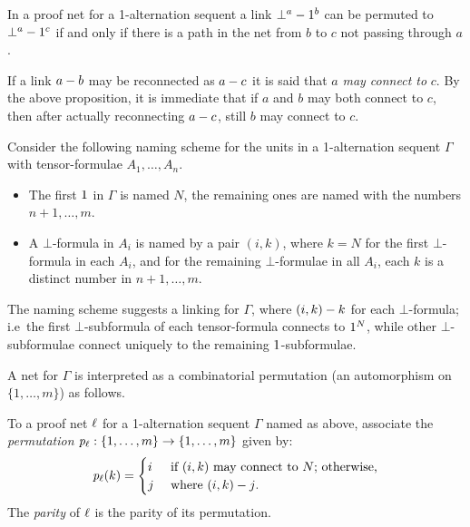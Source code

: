 \begin{proposition}
\label{prop:level0 may-connect path}
%
In a proof net for a 1-alternation sequent a link $\bot^{a}-1^{b}$ can be permuted to $\bot^{a}-1^{c}$ if and only if there is a path in the net from $b$ to $c$ not passing through $a$.
%
\end{proposition}


If a link $a-b$ may be reconnected as $a-c$ it is said that $a$ \emph{may connect to} $c$. 
%
By the above proposition, it is immediate that if $a$ and $b$ may both connect to $c$, then after actually reconnecting $a-c$, still $b$ may connect to $c$.



Consider the following naming scheme for the units in a 1-alternation sequent $\Gamma$ with tensor-formulae $A_1,\dotsc,A_n$.
%
\begin{itemize}

	\item
The first $1$ in $\Gamma$ is named $N$, the remaining ones are named with the numbers $n+1,\dotsc,m$.

	\item
A $\bot$-formula in $A_i$ is named by a pair $(i,k)$, where $k=N$ for the first $\bot$-formula in each $A_i$, and for the remaining $\bot$-formulae in all $A_i$, each $k$ is a distinct number in $n+1,\dotsc,m$.

\end{itemize}
%
The naming scheme suggests a linking for $\Gamma$, where $(i,k)-k$ for each $\bot$-formula; i.e\ the first $\bot$-subformula of each tensor-formula connects to $1^{N}$, while other $\bot$-subformulae connect uniquely to the remaining $1$-subformulae.



A net for $\Gamma$ is interpreted as a combinatorial permutation (an automorphism on $\{1,\dotsc,m\}$) as follows.
%
\begin{definition}
To a proof net $\ell$ for a 1-alternation sequent $\Gamma$ named as above, associate the \emph{permutation} $\mathit p_{\ell}:\{1,\dotsc,m\}\to\{1,\dotsc,m\}$ given by:
\[
	\mathit p_{\ell}(k) = 
	\begin{cases}
		i				& \text{ if $(i,k)$ may connect to $N$; otherwise,}
	\\	j				& \text{ where $(i,k)-j$.}
	\end{cases}
\]
The \emph{parity} of $\ell$ is the parity of its permutation.
\end{definition}


